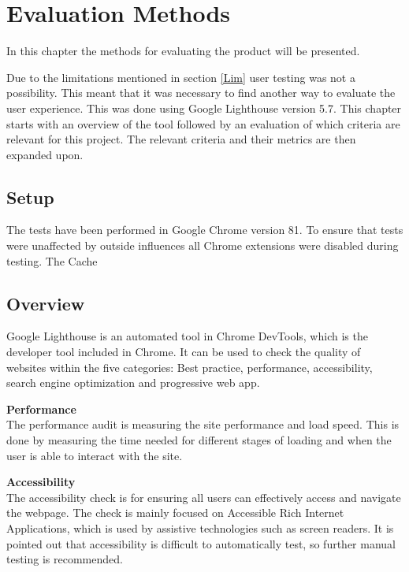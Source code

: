 \chapter{Evaluation Methods}

In this chapter the methods for evaluating the product will be presented.


Due to the limitations mentioned in section \ref{Lim} user testing was not a possibility. This meant that it was necessary to find another way to evaluate the user experience. This was done using Google Lighthouse version 5.7. 
This chapter starts with an overview of the tool followed by an evaluation of which criteria are relevant for this project. The relevant criteria and their metrics are then expanded upon.

\section{Setup}


The tests have been performed in Google Chrome version 81. To ensure that tests were unaffected by outside influences all Chrome extensions were disabled during testing. The Cache


\section{Overview}
Google Lighthouse is an automated tool in Chrome DevTools, which is the developer tool included in Chrome. It can be used to check the quality of websites within the five categories: Best practice, performance, accessibility, search engine optimization and progressive web app. \citep{Lighthouse}

\textbf{Performance}\\
The performance audit is measuring the site performance and load speed. This is done by measuring the time needed for different stages of loading and when the user is able to interact with the site. \citep{LhPerformance}


\textbf{Accessibility}\\
The accessibility check is for ensuring all users can effectively access and navigate the webpage. 
The check is mainly focused on Accessible Rich Internet Applications, which is used by assistive technologies such as screen readers.\citep{ARIA} It is pointed out that accessibility is difficult to automatically test, so further manual testing is recommended. 

\citep{LhAccess}

